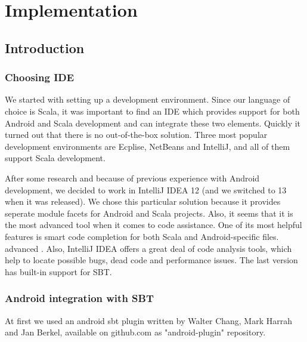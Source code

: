 %
%
%
%
%

\chapter{Implementation}
\label{chap:implementation}

\section{Introduction}
\label{sec:impl-intro}

\subsection{Choosing IDE}
\label{subsec:choosing-ide}
We started with setting up a development environment. Since our language of choice is Scala, it was important to find an IDE which provides support for both Android and Scala development and can integrate these two elements. Quickly it turned out that there is no out-of-the-box solution. Three most popular development environments are Ecplise, NetBeans and IntelliJ, and all of them support Scala development. 

After some research and because of previous experience with Android development, we decided to work in IntelliJ IDEA 12 (and we switched to 13 when it was released). We chose this particular solution because it provides seperate module facets for Android and Scala projects\cite{Steingress:2011:AndroidScala}. Also, it seems that it is the most advanced tool when it comes to code assistance. One of its most helpful features is smart code completion for both Scala and Android-specific files\cite{Steingress:2011:AndroidScala}. advanced . Also, IntelliJ IDEA offers a great deal of code analysis tools, which help to locate possible bugs, dead code and performance issues. The last version has built-in support for SBT. 

\subsection{Android integration with SBT}
\label{subsec:choosing-ide}
 At first we used an android sbt plugin written by Walter Chang, Mark Harrah and Jan Berkel, available on github.com as "android-plugin" repository. 





